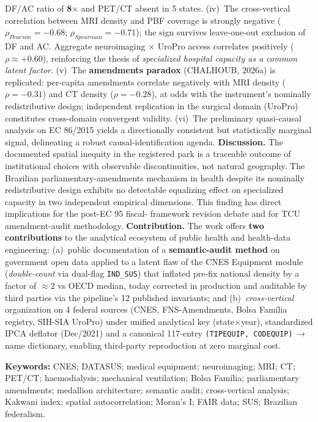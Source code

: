 \documentclass[12pt,a4paper,oneside]{article}
\begin{document}
\begin{singlespace}
DF/AC ratio of \textbf{8$\times$} and PET/CT absent in 5 states.
(iv)~The cross-vertical correlation between MRI density and PBF
coverage is strongly negative ($\rho_{Pearson} = -0.68$;
$\rho_{Spearman} = -0.71$); the sign survives leave-one-out
exclusion of DF and AC. Aggregate neuroimaging $\times$ UroPro
access correlates positively ($\rho \approx +0.60$), reinforcing
the thesis of \textit{specialized hospital capacity as a common
latent factor}.
(v)~The \textbf{amendments paradox} (CHALHOUB, 2026a) is
replicated: per-capita amendments correlate negatively with MRI
density ($\rho = -0.31$) and CT density ($\rho = -0.28$), at odds
with the instrument's nominally redistributive design;
independent replication in the surgical domain (UroPro)
constitutes cross-domain convergent validity.
(vi)~The preliminary quasi-causal analysis on EC 86/2015 yields
a directionally consistent but statistically marginal signal,
delineating a robust causal-identification agenda.
\textbf{Discussion.} The documented spatial inequity in the
registered park is a traceable outcome of institutional choices
with observable discontinuities, not natural geography. The
Brazilian parliamentary-amendments mechanism in health
\textemdash{} despite its nominally redistributive design
\textemdash{} exhibits no detectable equalizing effect on
specialized capacity in two independent empirical dimensions.
This finding has direct implications for the post-EC 95 fiscal-
framework revision debate and for TCU amendment-audit methodology.
\textbf{Contribution.} The work offers \textbf{two contributions}
to the analytical ecosystem of public health and health-data
engineering: (a)~public documentation of a \textbf{semantic-audit
method} on government open data \textemdash{} applied to a latent
flaw of the CNES Equipment module (\textit{double-count} via
dual-flag \texttt{IND\_SUS}) that inflated pre-fix national
density by a factor of $\approx$2 vs OECD median, today corrected
in production and auditable by third parties via the pipeline's
12 published invariants; and (b)~\textit{cross-vertical}
organization on 4 federal sources (CNES, FNS-Amendments, Bolsa
Família registry, SIH-SIA UroPro) under unified analytical key
(state$\times$year), standardized IPCA deflator (Dec/2021) and a
canonical 117-entry \texttt{(TIPEQUIP, CODEQUIP)}\,$\to$\,name
dictionary, enabling third-party reproduction at zero marginal
cost.

\vspace{4pt}
\textbf{Keywords:} CNES; DATASUS; medical equipment; neuroimaging;
MRI; CT; PET/CT; haemodialysis; mechanical ventilation; Bolsa
Família; parliamentary amendments; medallion architecture;
semantic audit; cross-vertical analysis; Kakwani index; spatial
autocorrelation; Moran's I; FAIR data; SUS; Brazilian federalism.
\end{singlespace}
\end{document}
